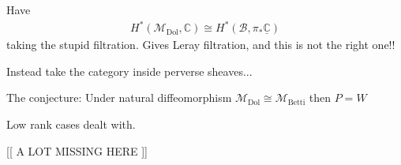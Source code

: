 Have 
\begin{align}
    H^* ( \mathcal{M}_{\mathrm{Dol}} , \mathbb{C} ) \cong H^* ( \mathcal{B} , \pi_* \underline{\mathbb{C} } ) 
\end{align}
taking the stupid filtration. 
Gives Leray filtration, and this is not the right one!! 

Instead take the category inside perverse sheaves... 

The conjecture: 
Under natural diffeomorphism 
$\mathcal{M}_{\mathrm{Dol}} \cong \mathcal{M}_{\mathrm{Betti}} $ then $ P= W $ 

Low rank cases dealt with.

[[ A LOT MISSING HERE ]] 









 

